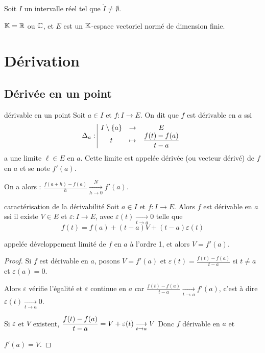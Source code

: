 Soit $I$ un intervalle réel tel que $\mathring{I} \neq \emptyset$.

$\mathbb{K} = \mathbb{R}$ ou $\mathbb{C}$, et $E$ est un $\mathbb{K}$-espace vectoriel normé
 de dimension finie.


\section{Dérivation }
\subsection{Dérivée en un point}

\begin{definition}{dérivable en un point}{}
    Soit $a \in I$ et $f: I \to E$. On dit que $f$ est dérivable en $a$ ssi 
    \[\Delta_a: \space \begin{array}{|ccc} \displaystyle I \setminus \{a\} & \to & \displaystyle E \\ \displaystyle t & \mapsto & \displaystyle \frac{f(t) - f(a)}{t-a} \end{array}\]
    a une limite $\ell \in E$ en $a$. Cette limite est appelée dérivée (ou vecteur dérivé)
    de $f$ en $a$ et se note $f'(a)$.

    On a alors : $\displaystyle \frac{f(a + h ) - f(a)}{h} \xrightarrow[h \to 0]{N} f'(a)$.
\end{definition}

\begin{proposition}{caractérisation de la dérivabilité}{}
    Soit $a \in I$ et $f: I \to E$. Alors $f$ est dérivable en $a$ ssi il existe $V \in E$
    et $\varepsilon : I \to E$, avec $\varepsilon(t) \xrightarrow[t \to a]{} 0$ telle que
    \[f(t) = f(a) + (t-a)V + (t-a)\varepsilon(t)\]

    appelée développement limité de $f$ en $a$ à l'ordre 1, et alors $V = f'(a)$.
\end{proposition}

\begin{proof}
    Si $f$ est dérivable en $a$, posons $V = f'(a)$ et $\varepsilon(t) = \frac{f(t) - f(a)}{t - a }$ si 
    $t \neq a$ et $\varepsilon(a) = 0$. 

    Alors $\varepsilon$ vérifie l'égalité et $\varepsilon$ continue en $a$ car 
    $\displaystyle \frac{f(t) - f(a)}{t-a} \xrightarrow[t \to a]{} f'(a)$, c'est à dire 
    $\varepsilon(t) \xrightarrow[t \to a]{} 0$.


    \svspace Si $\varepsilon$ et $V$ existent, $\displaystyle \frac{f(t) - f(a)}{t-a} = V + \varepsilon(t) \underset{t \to a}{\longrightarrow} V$
    Donc $f$ dérivable en $a$ et 
    
    $f'(a) = V$.
\end{proof}


